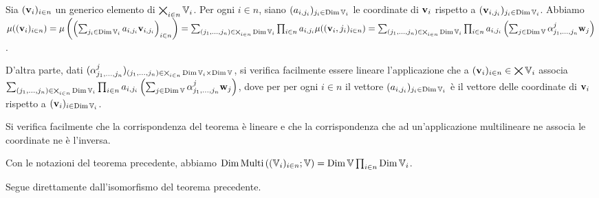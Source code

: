 \Proof Sia $(\mathbf{v}_i)_{i \in n}$ un generico elemento di $\bigtimes_{i \in n} \mathbb{V}_i$. Per ogni $i \in n$, siano $(a_{i,j_i})_{j_i \in \operatorname{\operatorname{Dim}}{\mathbb{V}_i}}$ le coordinate di $\mathbf{v}_i$ rispetto a $(\mathbf{v}_{i,j_i})_{j_i \in \operatorname{\operatorname{Dim}}{\mathbb{V}_i}}$. Abbiamo $\mu((\mathbf{v}_i)_{i \in n}) = \mu \left ( \left (\sum_{j_i \in \operatorname{\operatorname{Dim}}{\mathbb{V}_i}} a_{i,j_i} \mathbf{v}_{i,j_i} \right )_{i \in n} \right ) = \sum_{(j_1, ..., j_n) \in \bigtimes_{i \in n} \operatorname{\operatorname{Dim}}{\mathbb{V}_i}} \prod_{i \in n} a_{i,j_i} \mu((\mathbf{v}_i,j_i)_{i \in n}) = \sum_{(j_1,...,j_n) \in \bigtimes_{i \in n} \operatorname{\operatorname{Dim}}{\mathbb{V}_i}} \prod_{i \in n} a_{i,j_i} \left ( \sum_{j \in \operatorname{\operatorname{Dim}}{\mathbb{V}}} \alpha_{j_1,...,j_n}^j \mathbf{w}_j \right )$.
\par D'altra parte, dati $(\alpha_{j_1,...,j_n}^j)_{(j_1,...,j_n) \in \bigtimes_{i \in n} \operatorname{\operatorname{Dim}}{\mathbb{V}_i} \times \operatorname{\operatorname{Dim}}{\mathbb{V}}}$, si verifica facilmente essere lineare l'applicazione che a $(\mathbf{v}_i)_{i \in n} \in \bigtimes \mathbb{V}_i$ associa $\sum_{(j_1,...,j_n) \in \bigtimes_{i \in n} \operatorname{\operatorname{Dim}}{\mathbb{V}_i}} \prod_{i \in n} a_{i,j_i} \left ( \sum_{j \in \operatorname{\operatorname{Dim}}{\mathbb{V}}} \alpha_{j_1,...,j_n}^j \mathbf{w}_j \right )$, dove per per ogni $i \in n$ il vettore $(a_{i,j_i})_{j_i \in \operatorname{\operatorname{Dim}}{\mathbb{V}_i}}$ \`e il vettore delle coordinate di $\mathbf{v}_i$ rispetto a $(\mathbf{v}_i)_{i \in \operatorname{\operatorname{Dim}}{\mathbb{V}_i}}$.
\par Si verifica facilmente che la corrispondenza del teorema \`e lineare e che la corrispondenza che ad un'applicazione multilineare ne associa le coordinate ne \`e l'inversa. \EndProof
\begin{Corollary}
	Con le notazioni del teorema precedente, abbiamo $\operatorname{\operatorname{Dim}}{\text{Multi}\left ( (\mathbb{V}_i)_{i \in n} ; \mathbb{V} \right )} = \operatorname{\operatorname{Dim}}{\mathbb{V}} \prod_{i \in n} \operatorname{\operatorname{Dim}}{\mathbb{V}_i}$.
\end{Corollary}
\Proof Segue direttamente dall'isomorfismo del teorema precedente. \EndProof
